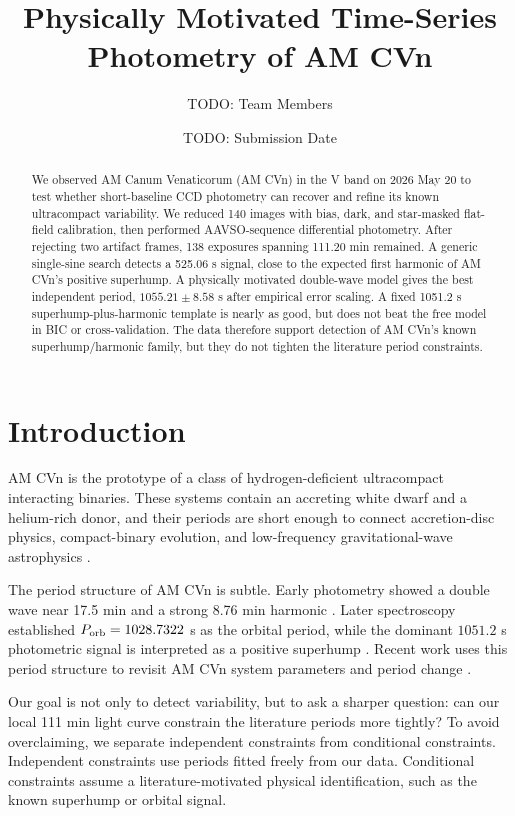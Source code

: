 \documentclass[11pt]{article}
\title{Physically Motivated Time-Series Photometry of AM CVn}
\author{TODO: Team Members}
\date{TODO: Submission Date}
\begin{document}
\maketitle

\begin{abstract}
We observed AM Canum Venaticorum (AM CVn) in the V band on 2026 May 20 to test
whether short-baseline CCD photometry can recover and refine its known
ultracompact variability.  We reduced 140 images with bias, dark, and
star-masked flat-field calibration, then performed AAVSO-sequence differential
photometry.  After rejecting two artifact frames, 138 exposures spanning
111.20 min remained.  A generic single-sine search detects a 525.06 s signal,
close to the expected first harmonic of AM CVn's positive superhump.  A
physically motivated double-wave model gives the best independent period,
\(1055.21 \pm 8.58\) s after empirical error scaling.  A fixed 1051.2 s
superhump-plus-harmonic template is nearly as good, but does not beat the free
model in BIC or cross-validation.  The data therefore support detection of AM
CVn's known superhump/harmonic family, but they do not tighten the literature
period constraints.
\end{abstract}

\section{Introduction}

AM CVn is the prototype of a class of hydrogen-deficient ultracompact
interacting binaries.  These systems contain an accreting white dwarf and a
helium-rich donor, and their periods are short enough to connect accretion-disc
physics, compact-binary evolution, and low-frequency gravitational-wave
astrophysics \cite{solheim2010,roelofs2006}.

The period structure of AM CVn is subtle.  Early photometry showed a double
wave near 17.5 min and a strong 8.76 min harmonic \cite{patterson1979}.  Later
spectroscopy established \(P_{\rm orb}=1028.7322\) s as the orbital period,
while the dominant \(1051.2\) s photometric signal is interpreted as a positive
superhump \cite{nelemans2001,roelofs2006}.  Recent work uses this period
structure to revisit AM CVn system parameters and period change
\cite{smak2023}.

Our goal is not only to detect variability, but to ask a sharper question: can
our local 111 min light curve constrain the literature periods more tightly?
To avoid overclaiming, we separate independent constraints from conditional
constraints.  Independent constraints use periods fitted freely from our data.
Conditional constraints assume a literature-motivated physical identification,
such as the known superhump or orbital signal.
\end{document}
